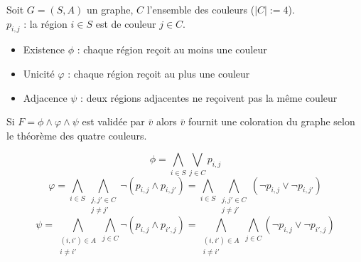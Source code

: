 \documentclass{article}
\begin{document}
Soit $G = (S, A)$ un graphe, $C$ l'ensemble des couleurs ($|C| := 4$). \\
$p_{i, j}$ : la région $i \in S$ est de couleur $j \in C$.
\begin{itemize}
    \item Existence $\phi$ : chaque région reçoit au moins une couleur
    \item Unicité $\varphi$ : chaque région reçoit au plus une couleur
    \item Adjacence $\psi$ : deux régions adjacentes ne reçoivent pas la même couleur
\end{itemize}
Si $F = \phi \land \varphi \land \psi$ est validée par $\bar{v}$ alors $\bar{v}$
fournit une coloration du graphe selon le théorème des quatre couleurs.

$$\phi = \displaystyle\bigwedge_{i \in S}\displaystyle\bigvee_{j \in C} p_{i, j}$$
$$\varphi
  = \displaystyle\bigwedge_{i \in S}
    \bigwedge_{\substack{j, j' \in C \\
    j \neq j'}}
    \neg(p_{i,j} \land p_{i, j'})
  = \displaystyle\bigwedge_{i \in S}
    \bigwedge_{\substack{j, j' \in C \\
    j \neq j'}}
    (\neg p_{i,j} \lor \neg p_{i, j'})$$
$$\psi
  = \bigwedge_{\substack{(i, i') \in A \\
    i \neq i'}}
    \displaystyle\bigwedge_{j \in C}
    \neg(p_{i,j} \land p_{i', j})
  = \bigwedge_{\substack{(i, i') \in A \\
    i \neq i'}}
    \displaystyle\bigwedge_{j \in C}
    (\neg p_{i,j} \lor \neg p_{i', j})
    $$
\end{document}
